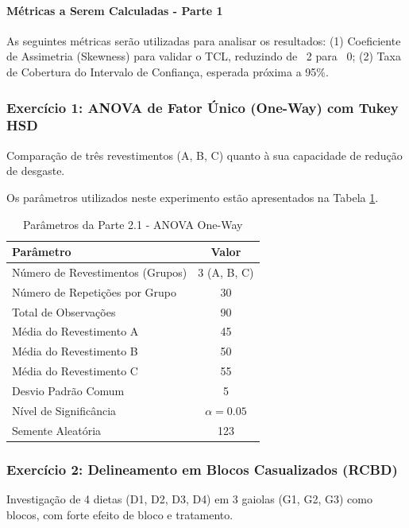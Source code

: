 \documentclass[12pt,a4paper,oneside]{article}
\begin{document}
\paragraph{Métricas a Serem Calculadas - Parte 1}

As seguintes métricas serão utilizadas para analisar os resultados: (1) Coeficiente de Assimetria (Skewness) para validar o TCL, reduzindo de ~2 para ~0; (2) Taxa de Cobertura do Intervalo de Confiança, esperada próxima a 95\%.

\subsubsection{Exercício 1: ANOVA de Fator Único (One-Way) com Tukey HSD}

Comparação de três revestimentos (A, B, C) quanto à sua capacidade de redução de desgaste.

Os parâmetros utilizados neste experimento estão apresentados na Tabela \ref{tab:param_parte2_1}.

\begin{table}[H]
\centering
\begin{tabular}{|l|c|}
\hline
\textbf{Parâmetro} & \textbf{Valor} \\
\hline
Número de Revestimentos (Grupos) & 3 (A, B, C) \\
Número de Repetições por Grupo & 30 \\
Total de Observações & 90 \\
Média do Revestimento A & 45 \\
Média do Revestimento B & 50 \\
Média do Revestimento C & 55 \\
Desvio Padrão Comum & 5 \\
Nível de Significância & $\alpha = 0.05$ \\
Semente Aleatória & 123 \\
\hline
\end{tabular}
\caption{Parâmetros da Parte 2.1 - ANOVA One-Way}
\label{tab:param_parte2_1}
\end{table}

\subsubsection{Exercício 2: Delineamento em Blocos Casualizados (RCBD)}

Investigação de 4 dietas (D1, D2, D3, D4) em 3 gaiolas (G1, G2, G3) como blocos, com forte efeito de bloco e tratamento.
\end{document}
